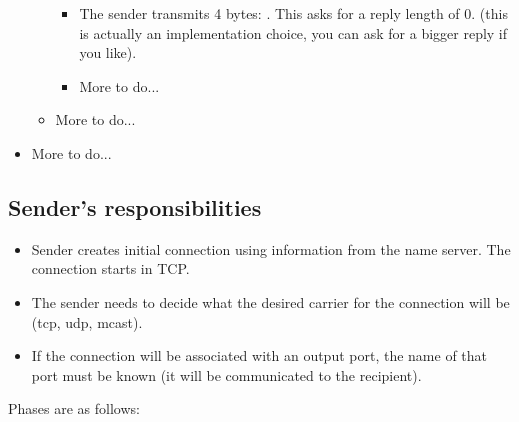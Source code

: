 \documentclass[a4]{article}
\newcommand{\packet}[1]{\framebox{#1}}
\begin{document}
\begin{itemize}
\begin{itemize}
\begin{itemize}
    \item The sender transmits 4 bytes: \packet{0 0 0 0}. This asks for
      a reply length of 0.  (this is actually an implementation
      choice, you can ask for a bigger reply if you like).
      
    \item More to do...
      
    \end{itemize}
    
  \item More to do...
    
  \end{itemize}

\item More to do...
  
\end{itemize}

\subsection{Sender's responsibilities}

\begin{itemize}

\item Sender creates initial connection using information 
from the name server.  The connection starts in TCP.

\item The sender needs to decide what the desired carrier
for the connection will be (tcp, udp, mcast).

\item If the connection will be associated with an output port, the
name of that port must be known (it will be communicated to the
recipient).

\end{itemize}

Phases are as follows:
\end{document}
